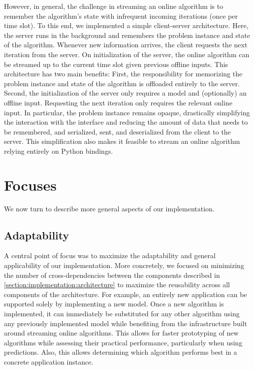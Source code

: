 However, in general, the challenge in streaming an online algorithm is to remember the algorithm's state with infrequent incoming iterations (once per time slot). To this end, we implemented a simple client-server architecture. Here, the server runs in the background and remembers the problem instance and state of the algorithm. Whenever new information arrives, the client requests the next iteration from the server. On initialization of the server, the online algorithm can be streamed up to the current time slot given previous offline inputs. This architecture has two main benefits: First, the responsibility for memorizing the problem instance and state of the algorithm is offloaded entirely to the server. Second, the initialization of the server only requires a model and (optionally) an offline input. Requesting the next iteration only requires the relevant online input. In particular, the problem instance remains opaque, drastically simplifying the interaction with the interface and reducing the amount of data that needs to be remembered, and serialized, sent, and deserialized from the client to the server. This simplification also makes it feasible to stream an online algorithm relying entirely on Python bindings.

\section{Focuses}

We now turn to describe more general aspects of our implementation.

\subsection{Adaptability}

A central point of focus was to maximize the adaptability and general applicability of our implementation. More concretely, we focused on minimizing the number of cross-dependencies between the components described in \cref{section:implementation:architecture} to maximize the reusability across all components of the architecture. For example, an entirely new application can be supported solely by implementing a new model. Once a new algorithm is implemented, it can immediately be substituted for any other algorithm using any previously implemented model while benefiting from the infrastructure built around streaming online algorithms. This allows for faster prototyping of new algorithms while assessing their practical performance, particularly when using predictions. Also, this allows determining which algorithm performs best in a concrete application instance.

